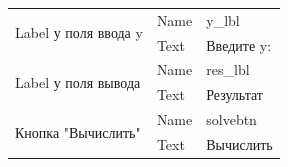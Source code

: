\begin{table}[H]
\begin{tabular}{|l|l|l|}
\multirow{2}{*}{Label у поля ввода y}                                       & Name                                                                           & y\_lbl                                                                     \\ \cline{2-3} 
                                                                            & Text                                                                           & Введите y:                                                                 \\ \hline
\multirow{2}{*}{Label у поля вывода}                                        & Name                                                                           & res\_lbl                                                                   \\ \cline{2-3} 
                                                                            & Text                                                                           & Результат                                                                  \\ \hline
\multirow{2}{*}{Кнопка "Вычислить"}                                         & Name                                                                           & solvebtn                                                                   \\ \cline{2-3} 
                                                                            & Text                                                                           & Вычислить                                                                  \\ \hline
\end{tabular}

\label{task2_attributes}
\end{table}


